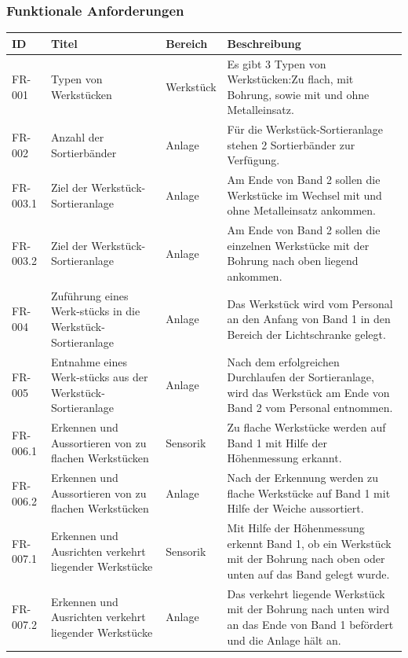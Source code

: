 \documentclass[oneside,a4paper,titlepage]{scrartcl} %
\begin{document}
\subsubsection{Funktionale Anforderungen}
\begin{small}
 \begin{longtable}{|p{2cm}|p{4cm}|p{1.5cm}|p{5.5cm}|}
  \hline
  \textbf{ID} & \textbf{Titel} & \textbf{Bereich} & \textbf{Beschreibung}\\
  \toprule
  \endhead
  \hline
  FR-001 & Typen von Werkstücken & Werkstück & Es gibt 3 Typen von Werkstücken:Zu flach, mit Bohrung, sowie mit und ohne Metalleinsatz.\\
  \hline
  \rowcolor{gray} FR-002 & Anzahl der Sortierbänder & Anlage & Für die Werkstück-Sortieranlage stehen 2 Sortierbänder zur Verfügung.\\
  \hline
  FR-003.1 & Ziel der Werkstück-Sortieranlage & Anlage & Am Ende von Band 2 sollen die Werkstücke im Wechsel mit und ohne Metalleinsatz ankommen.\\
  \hline
  FR-003.2 & Ziel der Werkstück-Sortieranlage & Anlage & Am Ende von Band 2 sollen die einzelnen Werkstücke mit der Bohrung nach oben liegend ankommen.\\
  \hline
  \rowcolor{gray} FR-004 & Zuführung eines Werk-stücks in die Werkstück-Sortieranlage & Anlage & Das Werkstück wird vom Personal an den Anfang von Band 1 in den Bereich der Lichtschranke gelegt.\\
  \hline
  FR-005 & Entnahme eines Werk-stücks aus der Werkstück-Sortieranlage & Anlage & Nach dem erfolgreichen Durchlaufen der Sortieranlage, wird das Werkstück am Ende von Band 2 vom Personal entnommen.\\
  \hline
  \rowcolor{gray} FR-006.1 & Erkennen und Aussortieren von zu flachen Werkstücken & Sensorik & Zu flache Werkstücke werden auf Band 1 mit Hilfe der Höhenmessung erkannt.\\
  \hline
  \rowcolor{gray} FR-006.2 & Erkennen und Aussortieren von zu flachen Werkstücken & Anlage & Nach der Erkennung werden zu flache Werkstücke auf Band 1 mit Hilfe der Weiche aussortiert.\\
  \hline
  FR-007.1 & Erkennen und Ausrichten verkehrt liegender Werkstücke & Sensorik & Mit Hilfe der Höhenmessung erkennt Band 1, ob ein Werkstück mit der Bohrung nach oben oder unten auf das Band gelegt wurde.\\
  \hline    
  FR-007.2 & Erkennen und Ausrichten verkehrt liegender Werkstücke & Anlage & Das verkehrt liegende Werkstück mit der Bohrung nach unten wird an das Ende von Band 1 befördert und die Anlage hält an.\\

\end{longtable}
\end{small}
\end{document}
